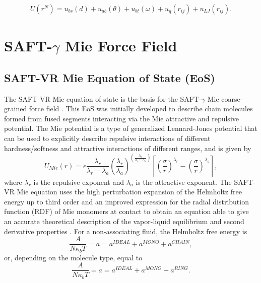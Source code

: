\begin{equation}
\begin{aligned}
U(r^N) = u_{bs}(d) + u_{ab}(\theta) + u_{bt}(\omega) + u_{q}(r_{ij}) + u_{LJ}(r_{ij}) .
\end{aligned}
\end{equation}

\section{SAFT-$\gamma$ Mie Force Field}
	
	
	\subsection{SAFT-VR Mie Equation of State (EoS)}
	
	The SAFT-VR Mie equation of state \cite{lafitte2013} is the basis for the SAFT-$\gamma$ Mie coarse-grained force field \cite{avendano2011}. This EoS was initially developed to describe chain molecules formed from fused segments interacting via the Mie attractive and repulsive potential. The Mie potential is a type of generalized Lennard-Jones potential that can be used to explicitly describe repulsive interactions of different hardness/softness and attractive interactions of different ranges, and is given by
	\begin{equation}
	U_{Mie}(r) = \epsilon\frac{\lambda_r}{\lambda_r - \lambda_a} \left(\frac{\lambda_r}{\lambda_a} \right)^{\left( \frac{\lambda_a}{\lambda_r - \lambda_a} \right)}
	\left[ \left(\frac{\sigma}{r} \right)^{\lambda_r} - \left(\frac{\sigma}{r} \right)^{\lambda_a} \right],
	\label{eqn:miepotential}
	\end{equation}
	where $\lambda_r$ is the repulsive exponent and $\lambda_a$ is the attractive exponent. The SAFT-VR Mie equation uses the  high perturbation expansion of the Helmholtz free energy up to third order and an improved expression for the  radial distribution function (RDF) of Mie monomers at contact to obtain an equation able to give an accurate theoretical description of the vapor-liquid equilibrium and second derivative properties \cite{lafitte2013}. For a non-associating fluid, the Helmholtz free energy is
	\begin{equation}
	\frac{A}{N\kappa_{b}T} = a = a^{IDEAL} + a^{MONO} + a^{CHAIN}, 
	\label{eqn:miehelm}
	\end{equation}
    or, depending on the molecule type, equal to 
	\begin{equation}
	\frac{A}{N\kappa_{b}T} = a = a^{IDEAL} + a^{MONO} + a^{RING}.
	\label{eqn:miehelmring}
	\end{equation}
    
